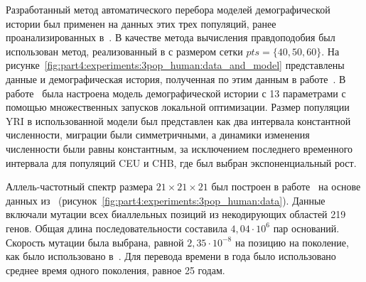 Разработанный метод автоматического перебора моделей демографической истории был применен на данных этих трех популяций, ранее проанализированных в~\cite{gutenkunst2009inferring}.
В качестве метода вычисления правдоподобия был использован метод, реализованный в \dadi с размером сетки $pts=\{40, 50, 60\}$.
На рисунке~\ref{fig:part4:experiments:3pop_human:data_and_model} представлены данные и демографическая история, полученная по этим данным в работе~\cite{gutenkunst2009inferring}.
В работе~\cite{gutenkunst2009inferring} была настроена модель демографической истории с 13 параметрами с помощью множественных запусков локальной оптимизации.
Размер популяции YRI в использованной модели был представлен как два интервала константной численности, миграции были симметричными, а динамики изменения численности были равны константным, за исключением последнего временного интервала для популяций CEU и CHB, где был выбран экспоненциальный рост.

Аллель-частотный спектр размера $21 \times 21 \times 21$ был построен в работе~\cite{gutenkunst2009inferring} на основе данных из~\cite{sharp2000environmental} (рисунок~\ref{fig:part4:experiments:3pop_human:data}).
Данные включали мутации всех биаллельных позиций из некодирующих областей 219 генов.
Общая длина последовательности составила $4{,}04\cdot 10^6$ пар оснований.
Скорость мутации была выбрана, равной $2{,}35 \cdot 10^{-8}$ на позицию на поколение, как было использовано в~\cite{gutenkunst2009inferring}.
Для перевода времени в года было использовано среднее время одного поколения, равное 25 годам.

